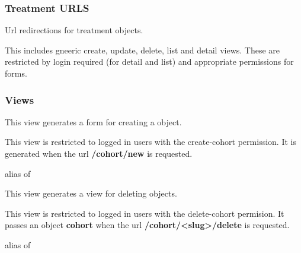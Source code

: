 \documentclass[letterpaper,10pt,english]{sphinxmanual}
\begin{document}
\subsubsection{Treatment URLS}
\label{data:treatment-urls}\label{data:module-mousedb.data.urls.treatment}
Url redirections for treatment objects.

This includes gneeric create, update, delete, list and detail views.
These are restricted by login required (for detail and list) and appropriate permissions for forms.


\subsubsection{Views}
\label{data:views}\label{data:module-mousedb.data.views}

\begin{fulllineitems}
\label{data:mousedb.data.views.CohortCreate}
This view generates a form for creating a {\hyperref[data:mousedb.data.models.Cohort]{}} object.

This view is restricted to logged in users with the create-cohort permission.
It is generated when the url \textbf{/cohort/new} is requested.

\begin{fulllineitems}
\label{data:mousedb.data.views.CohortCreate.model}
alias of 

\end{fulllineitems}


\end{fulllineitems}


\begin{fulllineitems}
\label{data:mousedb.data.views.CohortDelete}
This view generates a view for deleting {\hyperref[data:mousedb.data.models.Cohort]{}} objects.

This view is restricted to logged in users with the delete-cohort permision. 
It passes an object \textbf{cohort} when the url \textbf{/cohort/\textless{}slug\textgreater{}/delete} is requested.

\begin{fulllineitems}
\label{data:mousedb.data.views.CohortDelete.model}
alias of 

\end{fulllineitems}


\end{fulllineitems}
\end{document}
